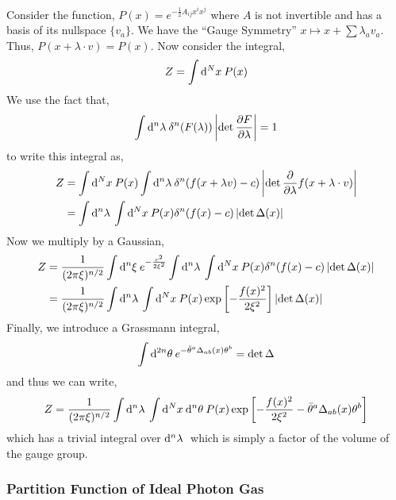 \documentclass[12pt]{extarticle}
\begin{document}
Consider the function, $P(x) = e^{-\frac{1}{2} A_{ij} x^i x^j}$ where $A$ is not invertible and has a basis of its nullspace $\{ v_a \}$. We have the ``Gauge Symmetry'' $x \mapsto x + \sum \lambda_a v_a$. Thus, $P(x + \lambda \cdot v) = P(x)$. Now consider the integral,
\[ Z = \int \mathrm{d}^{N} x \: P(x) \]
We use the fact that,
\[ \int \mathrm{d}^{n} \lambda \: \delta^n(F(\lambda)) \left| \det{\frac{\partial{F}}{\partial{\lambda}}} \right| = 1 \]
to write this integral as,
\begin{align*}
Z & = \int \mathrm{d}^{N} x \: P(x) \int \mathrm{d}^{n} \lambda \: \delta^n(f(x + \lambda v) - c)   \left| \det{\frac{\partial{}}{\partial{\lambda}} f(x + \lambda \cdot v)} \right|   
\\
& = \int \mathrm{d}^{n} \lambda \: \int \mathrm{d}^{N} x \: P(x)  \delta^n(f(x) - c)   \left| \det{\Delta(x)} \right|   
\end{align*}
Now we multiply by a Gaussian,
\begin{align*}
Z &= \frac{1}{(2 \pi \xi)^{n/2}} \int \mathrm{d}^{n} \xi \: e^{-\frac{c^2}{2 \xi^2}} \int \mathrm{d}^{n} \lambda \: \int \mathrm{d}^{N} x \: P(x)  \delta^n(f(x) - c)   \left| \det{\Delta(x)} \right|   
\\
&= \frac{1}{(2 \pi \xi)^{n/2}} \int \mathrm{d}^{n} \lambda \: \int \mathrm{d}^{N} x \: P(x) \exp{\left[-\frac{f(x)^2}{2 \xi^2} \right]}  \left| \det{\Delta(x)} \right|  
\end{align*}
Finally, we introduce a Grassmann integral,
\[ \int \mathrm{d}^{2n} \theta \: e^{- \bar{\theta}^a \Delta_{ab}(x) \theta^b} = \det{\Delta} \]
and thus we can write,
\[ Z = \frac{1}{(2 \pi \xi)^{n/2}} \int \mathrm{d}^{n} \lambda \: \int \mathrm{d}^{N} x \: \mathrm{d}^{n} \theta \: P(x) \exp{\left[-\frac{f(x)^2}{2 \xi^2} - \bar{\theta}^a \Delta_{ab}(x) \theta^b \right]} \]
which has a trivial integral over $\mathrm{d}^{n} \lambda \:$ which is simply a factor of the volume of the gauge group. 

\subsubsection{Partition Function of Ideal Photon Gas}
\end{document}

